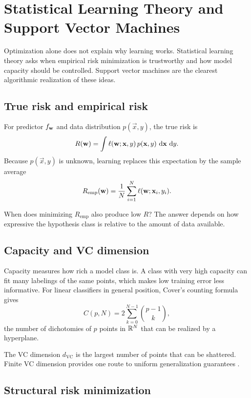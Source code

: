 \chapter{Statistical Learning Theory and Support Vector Machines}

Optimization alone does not explain why learning works. Statistical learning theory asks when empirical risk minimization is trustworthy and how model capacity should be controlled. Support vector machines are the clearest algorithmic realization of these ideas.

\section{True risk and empirical risk}

For predictor $f_{\mathbf{w}}$ and data distribution $p(\vec{x},y)$, the true risk is
\[
  R(\mathbf{w})
  =
  \int \ell(\mathbf{w};\mathbf{x},y)\, p(\mathbf{x},y)\,\mathop{}\!\mathrm{d} \mathbf{x}\,\mathop{}\!\mathrm{d} y.
\]
Because $p(\vec{x},y)$ is unknown, learning replaces this expectation by the sample average
\[
  R_{\mathrm{emp}}(\mathbf{w})
  =
  \frac{1}{N}\sum_{i=1}^{N} \ell(\mathbf{w};\mathbf{x}_i,y_i).
\]

\begin{aside}
When does minimizing $R_{\mathrm{emp}}$ also produce low $R$? The answer depends on how expressive the hypothesis class is relative to the amount of data available.
\end{aside}

\section{Capacity and VC dimension}

Capacity measures how rich a model class is. A class with very high capacity can fit many labelings of the same points, which makes low training error less informative. For linear classifiers in general position, Cover's counting formula gives
\[
  C(p,N)
  =
  2\sum_{k=0}^{N-1} \binom{p-1}{k},
\]
the number of dichotomies of $p$ points in $\mathbb{R}^N$ that can be realized by a hyperplane.

The VC dimension $d_{\mathrm{VC}}$ is the largest number of points that can be shattered. Finite VC dimension provides one route to uniform generalization guarantees \parencite{vapnik1998statistical,hastie2009elements}.

\section{Structural risk minimization}

